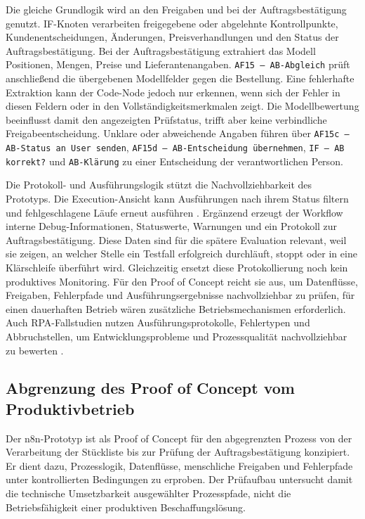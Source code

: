 \documentclass[a4paper,12pt]{article}
\begin{document}
Die gleiche Grundlogik wird an den Freigaben und bei der Auftragsbestätigung genutzt. IF-Knoten verarbeiten freigegebene oder abgelehnte Kontrollpunkte, Kundenentscheidungen, Änderungen, Preisverhandlungen und den Status der Auftragsbestätigung. Bei der Auftragsbestätigung extrahiert das Modell Positionen, Mengen, Preise und Lieferantenangaben. \texttt{AF15 -- AB-Abgleich} prüft anschließend die übergebenen Modellfelder gegen die Bestellung. Eine fehlerhafte Extraktion kann der Code-Node jedoch nur erkennen, wenn sich der Fehler in diesen Feldern oder in den Vollständigkeitsmerkmalen zeigt. Die Modellbewertung beeinflusst damit den angezeigten Prüfstatus, trifft aber keine verbindliche Freigabeentscheidung. Unklare oder abweichende Angaben führen über \texttt{AF15c -- AB-Status an User senden}, \texttt{AF15d -- AB-Entscheidung übernehmen}, \texttt{IF -- AB korrekt?} und \texttt{AB-Klärung} zu einer Entscheidung der verantwortlichen Person.

Die Protokoll- und Ausführungslogik stützt die Nachvollziehbarkeit des Prototyps. Die Execution-Ansicht kann Ausführungen nach ihrem Status filtern und fehlgeschlagene Läufe erneut ausführen \parencite{n8n_docs_2026}. Ergänzend erzeugt der Workflow interne Debug-Informationen, Statuswerte, Warnungen und ein Protokoll zur Auftragsbestätigung. Diese Daten sind für die spätere Evaluation relevant, weil sie zeigen, an welcher Stelle ein Testfall erfolgreich durchläuft, stoppt oder in eine Klärschleife überführt wird. Gleichzeitig ersetzt diese Protokollierung noch kein produktives Monitoring. Für den Proof of Concept reicht sie aus, um Datenflüsse, Freigaben, Fehlerpfade und Ausführungsergebnisse nachvollziehbar zu prüfen, für einen dauerhaften Betrieb wären zusätzliche Betriebsmechanismen erforderlich. Auch RPA-Fallstudien nutzen Ausführungsprotokolle, Fehlertypen und Abbruchstellen, um Entwicklungsprobleme und Prozessqualität nachvollziehbar zu bewerten \parencite{vollenberg_entwicklungsbeschleunigung_2021}.

\subsection{Abgrenzung des Proof of Concept vom Produktivbetrieb}
\label{sec:prototyp-produktiv}

Der n8n-Prototyp ist als Proof of Concept für den abgegrenzten Prozess von der Verarbeitung der Stückliste bis zur Prüfung der Auftragsbestätigung konzipiert. Er dient dazu, Prozesslogik, Datenflüsse, menschliche Freigaben und Fehlerpfade unter kontrollierten Bedingungen zu erproben. Der Prüfaufbau untersucht damit die technische Umsetzbarkeit ausgewählter Prozesspfade, nicht die Betriebsfähigkeit einer produktiven Beschaffungslösung.
\end{document}
